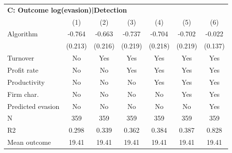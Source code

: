 \begin{tabular}{lcccccc}
\midrule \multicolumn{7}{l}{\textbf{C: Outcome log(evasion)|Detection}} \\ \multicolumn{1}{l}{} & (1) & (2) & (3) & (4) & (5) & (6) \\ \midrule
Algorithm   &      -0.764\sym{***}&      -0.663\sym{***}&      -0.737\sym{***}&      -0.704\sym{***}&      -0.702\sym{***}&      -0.022         \\
            &     (0.213)         &     (0.216)         &     (0.219)         &     (0.218)         &     (0.219)         &     (0.137)         \\
\midrule
Turnover    &          No         &         Yes         &         Yes         &         Yes         &         Yes         &         Yes         \\
Profit rate &          No         &          No         &         Yes         &         Yes         &         Yes         &         Yes         \\
Productivity&          No         &          No         &          No         &         Yes         &         Yes         &         Yes         \\
Firm char.  &          No         &          No         &          No         &          No         &         Yes         &         Yes         \\
Predicted evasion&          No         &          No         &          No         &          No         &          No         &         Yes         \\
N           &         359         &         359         &         359         &         359         &         359         &         359         \\
R2          &       0.298         &       0.339         &       0.362         &       0.384         &       0.387         &       0.828         \\
Mean outcome&       19.41         &       19.41         &       19.41         &       19.41         &       19.41         &       19.41         \\
\bottomrule \end{tabular}
